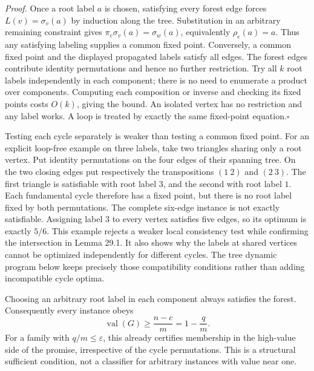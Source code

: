 \documentclass[11pt]{article}
\begin{document}
\emph{Proof.} Once a root label $a$ is chosen, satisfying every forest
edge forces $L(v)=\sigma_v(a)$ by induction along the tree. Substitution
in an arbitrary remaining constraint gives
$\pi_e\sigma_v(a)=\sigma_w(a)$, equivalently $\rho_e(a)=a$.
Thus any satisfying labeling supplies a common fixed point. Conversely,
a common fixed point and the displayed propagated labels satisfy all edges.
The forest edges contribute identity permutations and hence no further
restriction. Try all $k$ root labels independently in each component;
there is no need to enumerate a product over components. Computing each
composition or inverse and checking its fixed points costs $O(k)$, giving
the bound. An isolated vertex has no restriction and any label works.
A loop is treated by exactly the same fixed-point equation.\hfill$\square$

Testing each cycle separately is weaker than testing a common fixed point.
For an explicit loop-free example on three labels, take two triangles sharing
only a root vertex. Put identity permutations on the four edges of their
spanning tree. On the two closing edges put respectively the transpositions
$(1\ 2)$ and $(2\ 3)$. The first triangle is satisfiable with root label
$3$, and the second with root label $1$. Each fundamental cycle therefore
has a fixed point, but there is no root label fixed by both permutations.
The complete six-edge instance is not exactly satisfiable. Assigning label
$3$ to every vertex satisfies five edges, so its optimum is exactly $5/6$.
This example rejects a weaker local consistency test while confirming the
intersection in Lemma 29.1. It also shows why the labels at shared vertices
cannot be optimized independently for different cycles. The tree dynamic
program below keeps precisely those compatibility conditions rather than
adding incompatible cycle optima.

Choosing an arbitrary root label in each component always satisfies the
forest. Consequently every instance obeys
\begin{equation}\label{a29:forestbound}
                 \operatorname{val}(G)\ge\frac{n-c}{m}
                                     =1-\frac qm.
\end{equation}
For a family with $q/m\le\varepsilon$, this already certifies membership
in the high-value side of the promise, irrespective of the cycle permutations.
This is a structural sufficient condition, not a classifier for arbitrary
instances with value near one.
\end{document}
